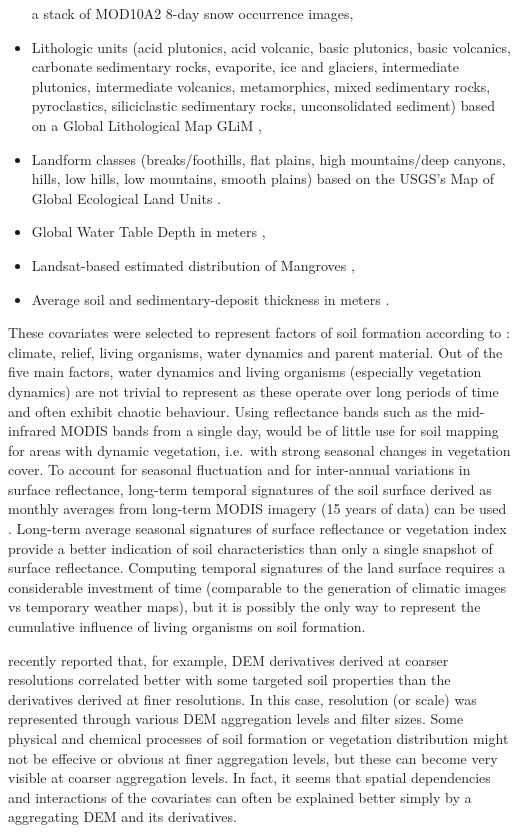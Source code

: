 \documentclass[11pt]{krantz}
\theoremstyle{definition}
\theoremstyle{definition}
\theoremstyle{definition}
\theoremstyle{remark}
\begin{document}
\begin{itemize}
  a stack of MOD10A2 8-day snow occurrence images,
\item
  Lithologic units (acid plutonics, acid volcanic, basic plutonics,
  basic volcanics, carbonate sedimentary rocks, evaporite, ice and
  glaciers, intermediate plutonics, intermediate volcanics,
  metamorphics, mixed sedimentary rocks, pyroclastics, siliciclastic
  sedimentary rocks, unconsolidated sediment) based on a Global
  Lithological Map GLiM \citep{GGGE:GGGE2352},
\item
  Landform classes (breaks/foothills, flat plains, high mountains/deep
  canyons, hills, low hills, low mountains, smooth plains) based on the
  USGS's Map of Global Ecological Land Units \citep{sayre2014new}.
\item
  Global Water Table Depth in meters \citep{fan2013global},
\item
  Landsat-based estimated distribution of Mangroves
  \citep{giri2011status},
\item
  Average soil and sedimentary-deposit thickness in meters
  \citep{Pelletier2016}.
\end{itemize}

These covariates were selected to represent factors of soil formation
according to \citet{jenny1994factors}: climate, relief, living
organisms, water dynamics and parent material. Out of the five main
factors, water dynamics and living organisms (especially vegetation
dynamics) are not trivial to represent as these operate over long
periods of time and often exhibit chaotic behaviour. Using reflectance
bands such as the mid-infrared MODIS bands from a single day, would be
of little use for soil mapping for areas with dynamic vegetation,
i.e.~with strong seasonal changes in vegetation cover. To account for
seasonal fluctuation and for inter-annual variations in surface
reflectance, long-term temporal signatures of the soil surface derived
as monthly averages from long-term MODIS imagery (15 years of data) can
be used \citep{Hengl2017SoilGrids250m}. Long-term average seasonal
signatures of surface reflectance or vegetation index provide a better
indication of soil characteristics than only a single snapshot of
surface reflectance. Computing temporal signatures of the land surface
requires a considerable investment of time (comparable to the generation
of climatic images vs temporary weather maps), but it is possibly the
only way to represent the cumulative influence of living organisms on
soil formation.

\citet{Behrens2018128} recently reported that, for example, DEM
derivatives derived at coarser resolutions correlated better with some
targeted soil properties than the derivatives derived at finer
resolutions. In this case, resolution (or scale) was represented through
various DEM aggregation levels and filter sizes. Some physical and
chemical processes of soil formation or vegetation distribution might
not be effecive or obvious at finer aggregation levels, but these can
become very visible at coarser aggregation levels. In fact, it seems
that spatial dependencies and interactions of the covariates can often
be explained better simply by a aggregating DEM and its derivatives.
\end{document}
